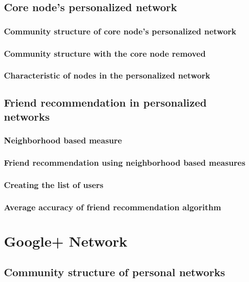 \documentclass[11pt]{article}
\begin{document}
\subsection{Core node’s personalized network}

\subsubsection{Community structure of core node’s personalized network}

\subsubsection{Community structure with the core node removed}

\subsubsection{Characteristic of nodes in the personalized network}


\subsection{Friend recommendation in personalized networks}

\subsubsection{Neighborhood based measure}


\subsubsection{Friend recommendation using neighborhood based measures}

\subsubsection{Creating the list of users}

\subsubsection{Average accuracy of friend recommendation algorithm}





\section{Google+ Network}

\subsection{Community structure of personal networks}
\end{document}

